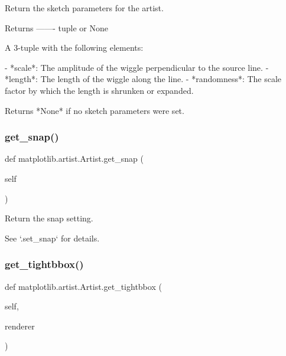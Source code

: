 \begin{DoxyVerb}Return the sketch parameters for the artist.

Returns
-------
tuple or None

    A 3-tuple with the following elements:

    - *scale*: The amplitude of the wiggle perpendicular to the
      source line.
    - *length*: The length of the wiggle along the line.
    - *randomness*: The scale factor by which the length is
      shrunken or expanded.

    Returns *None* if no sketch parameters were set.
\end{DoxyVerb}
 \mbox{\label{classmatplotlib_1_1artist_1_1Artist_a0f1f927f7a9111bb1befa1ba633885e2}} 
\subsubsection{\texorpdfstring{get\+\_\+snap()}{get\_snap()}}
{\footnotesize\ttfamily def matplotlib.\+artist.\+Artist.\+get\+\_\+snap (\begin{DoxyParamCaption}\item[{}]{self }\end{DoxyParamCaption})}

\begin{DoxyVerb}Return the snap setting.

See `.set_snap` for details.
\end{DoxyVerb}
 \mbox{\label{classmatplotlib_1_1artist_1_1Artist_a69562533787dbd3772d3da3b2d97a1ff}} 
\subsubsection{\texorpdfstring{get\+\_\+tightbbox()}{get\_tightbbox()}}
{\footnotesize\ttfamily def matplotlib.\+artist.\+Artist.\+get\+\_\+tightbbox (\begin{DoxyParamCaption}\item[{}]{self,  }\item[{}]{renderer }\end{DoxyParamCaption})}

